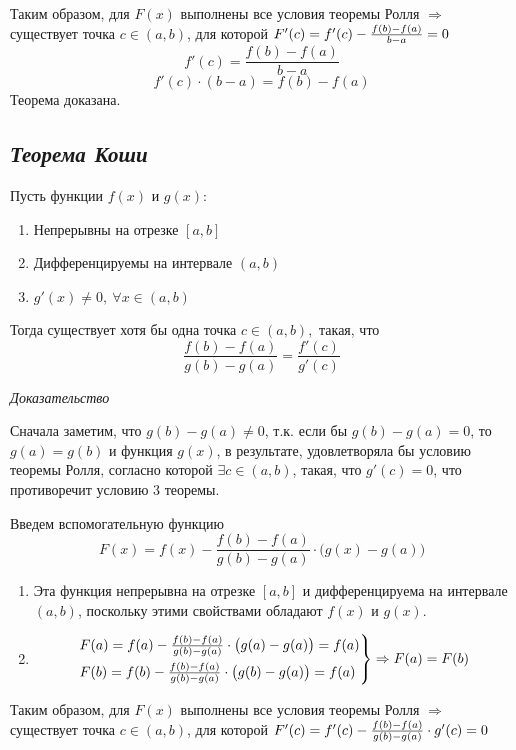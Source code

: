 Таким образом, для $F(x)$ выполнены все условия теоремы Ролля $\Rightarrow$ существует точка $c \in (a, b)$, для которой $F'(c) = f'(c) - {\Large\frac{f(b) - f(a)}{b - a}}= 0$ $$f'(c) = {\frac{f(b) - f(a)}{b - a}}$$ $$f'(c)\cdot (b - a) = f(b) - f(a)$$ Теорема доказана.
\newpage 
\subsection{\textit{Теорема Коши}}

Пусть функции $f(x)$ и $g(x)$:
\begin{enumerate}

\item Непрерывны на отрезке $[a, b]$
\item Дифференцируемы на интервале $(a, b)$
\item $g'(x) \neq 0, \ \forall x \in (a, b)$

\end{enumerate}

Тогда существует хотя бы одна точка $c \in (a, b),$ такая, что $$\frac{f(b) - f(a)}{g(b)-g(a)} = \frac{f'(c)}{g'(c)}$$

\textit{Доказательство}

Сначала заметим, что $g(b) - g(a) \neq 0$, т.к. если бы $g(b) - g(a) = 0$, то $g(a) = g(b)$ и функция $g(x)$, в результате, удовлетворяла бы условию теоремы Ролля, согласно которой $\exists c \in (a, b)$, такая, что $g'(c) = 0$, что противоречит условию 3 теоремы.

Введем вспомогательную функцию $$F(x) = f(x) - \frac{f(b) - f(a)}{g(b)-g(a)}\cdot \big(g(x) - g(a)\big)$$
\begin{enumerate}

\item Эта функция непрерывна на отрезке $[a, b]$ и дифференцируема на интервале $(a, b)$, поскольку этими свойствами обладают $f(x)$ и $g(x)$.
\item $$\begin{rcases}
    F(a) = f(a) - {\Large\frac{f(b) - f(a)}{g(b)-g(a)}}\cdot \big(g(a) - g(a)\big) = f(a)\\
    F(b) = f(b) - {\Large\frac{f(b) - f(a)}{g(b)-g(a)}}\cdot \big(g(b) - g(a)\big) = f(a)
    \end{rcases} \Rightarrow F(a) = F(b)$$

\end{enumerate}

Таким образом, для $F(x)$ выполнены все условия теоремы Ролля $\Rightarrow$ существует точка $c \in (a, b)$, для которой $F'(c) = f'(c) - {\Large\frac{f(b) - f(a)}{g(b)-g(a)}}\cdot g'(c) = 0$


